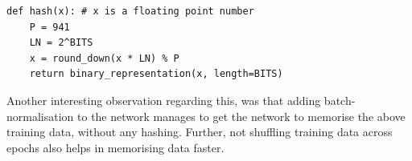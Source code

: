 \documentclass{ociamthesis}
\begin{document}
\lstset{language=Python}
\lstset{frame=lines}
 
\lstset{basicstyle=\footnotesize}
\begin{lstlisting}
def hash(x): # x is a floating point number
    P = 941
    LN = 2^BITS
    x = round_down(x * LN) % P
    return binary_representation(x, length=BITS) 
\end{lstlisting}
Another interesting observation regarding this, was that adding
batch-normalisation \citep{batch-norm} to the network manages to get the network
to memorise the above training data, without any hashing. Further, not shuffling
training data across epochs also helps in memorising data faster.
\end{document}
